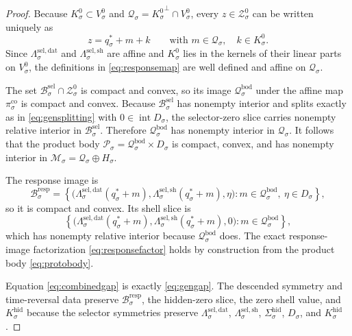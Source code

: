 \documentclass[11pt]{article}
\newcommand{\ProtoSpace}[1]{\mathcal M_{#1}}
\newcommand{\ProtoBody}[1]{\mathcal P_{#1}}
\newcommand{\ResponseImage}[1]{\mathcal B_{#1}^{\mathrm{resp}}}
\newcommand{\GapSpace}[1]{H_{#1}}
\newcommand{\GapBody}[1]{D_{#1}}
\newcommand{\HiddenOperator}[1]{K_{#1}^{\mathrm{hid}}}
\newcommand{\GenBody}[1]{\mathcal B_{#1}^{\mathrm{sel}}}
\newcommand{\GenData}[1]{\Lambda_{#1}^{\mathrm{sel,dat}}}
\newcommand{\GenShell}[1]{\Lambda_{#1}^{\mathrm{sel,sh}}}
\newcommand{\HiddenSel}[1]{\Sigma_{#1}^{\mathrm{hid}}}
\newcommand{\ZeroHiddenSlice}[1]{\mathcal Z_{#1}^{0}}
\newcommand{\ZeroHiddenVec}[1]{V_{#1}^{0}}
\newcommand{\Kernel}[1]{K_{#1}^{0}}
\newcommand{\CoreState}[1]{\mathcal Q_{#1}}
\newcommand{\ReferencePoint}[1]{q_{#1}^{\ast}}
\newcommand{\CoreCoord}[1]{\pi_{#1}^{\mathrm{co}}}
\newcommand{\CoreBody}[1]{\mathcal Q_{#1}^{\mathrm{bod}}}
\begin{document}
\begin{proof}
Because \(\Kernel{\sigma}\subset\ZeroHiddenVec{\sigma}\) and \(\CoreState{\sigma}={\Kernel{\sigma}}^{\perp}\cap\ZeroHiddenVec{\sigma}\), every \(z\in\ZeroHiddenSlice{\sigma}\) can be written uniquely as
\[
z=\ReferencePoint{\sigma}+m+k
\qquad
\text{with }
m\in\CoreState{\sigma},
\quad
k\in\Kernel{\sigma}.
\]
Since \(\GenData{\sigma}\) and \(\GenShell{\sigma}\) are affine and \(\Kernel{\sigma}\) lies in the kernels of their linear parts on \(\ZeroHiddenVec{\sigma}\), the definitions in \eqref{eq:responsemap} are well defined and affine on \(\CoreState{\sigma}\).

The set \(\GenBody{\sigma}\cap\ZeroHiddenSlice{\sigma}\) is compact and convex, so its image \(\CoreBody{\sigma}\) under the affine map \(\CoreCoord{\sigma}\) is compact and convex. Because \(\GenBody{\sigma}\) has nonempty interior and splits exactly as in \eqref{eq:gensplitting} with \(0\in\operatorname{int}\GapBody{\sigma}\), the selector-zero slice carries nonempty relative interior in \(\GenBody{\sigma}\). Therefore \(\CoreBody{\sigma}\) has nonempty interior in \(\CoreState{\sigma}\). It follows that the product body \(\ProtoBody{\sigma}=\CoreBody{\sigma}\times\GapBody{\sigma}\) is compact, convex, and has nonempty interior in \(\ProtoSpace{\sigma}=\CoreState{\sigma}\oplus\GapSpace{\sigma}\).

The response image is
\[
\ResponseImage{\sigma}
=
\left\{
\bigl(
\GenData{\sigma}(\ReferencePoint{\sigma}+m),
\GenShell{\sigma}(\ReferencePoint{\sigma}+m),
\eta
\bigr):
m\in\CoreBody{\sigma},
\ \eta\in\GapBody{\sigma}
\right\},
\]
so it is compact and convex. Its shell slice is
\[
\left\{
\bigl(
\GenData{\sigma}(\ReferencePoint{\sigma}+m),
\GenShell{\sigma}(\ReferencePoint{\sigma}+m),
0
\bigr):
m\in\CoreBody{\sigma}
\right\},
\]
which has nonempty relative interior because \(\CoreBody{\sigma}\) does. The exact response-image factorization \eqref{eq:responsefactor} holds by construction from the product body \eqref{eq:protobody}.

Equation \eqref{eq:combinedgap} is exactly \eqref{eq:gengap}. The descended symmetry and time-reversal data preserve \(\ResponseImage{\sigma}\), the hidden-zero slice, the zero shell value, and \(\HiddenOperator{\sigma}\) because the selector symmetries preserve \(\GenData{\sigma}\), \(\GenShell{\sigma}\), \(\HiddenSel{\sigma}\), \(\GapBody{\sigma}\), and \(\HiddenOperator{\sigma}\).


\end{proof}
\end{document}
